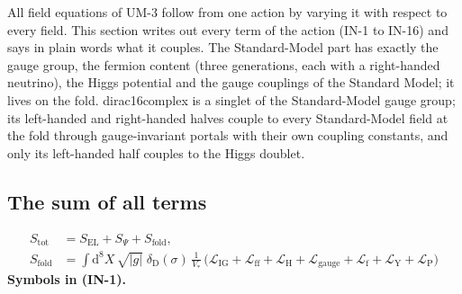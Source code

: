 \documentclass[
  10pt,
]{article}
\begin{document}
All field equations of UM-3 follow from one action by varying it with
respect to every field. This section writes out every term of the action
(IN-1 to IN-16) and says in plain words what it couples. The
Standard-Model part has exactly the gauge group, the fermion content
(three generations, each with a right-handed neutrino), the Higgs
potential and the gauge couplings of the Standard Model; it lives on the
fold. dirac16complex is a singlet of the Standard-Model gauge group; its
left-handed and right-handed halves couple to every Standard-Model field
at the fold through gauge-invariant portals with their own coupling
constants, and only its left-handed half couples to the Higgs doublet.

\hypertarget{the-sum-of-all-terms}{%
\subsection{The sum of all terms}\label{the-sum-of-all-terms}}

\[
\begin{aligned}
S_{\mathrm{tot}} &= S_{\mathrm{EL}} + S_\Psi + S_{\mathrm{fold}},\\
S_{\mathrm{fold}} &= \int\mathrm{d}^8X\,\sqrt{\lvert g\rvert}\;\delta_{\mathrm{D}}(\sigma)\,\frac{1}{V_*}\,
\big(\mathcal{L}_{\mathrm{IG}} + \mathcal{L}_{\mathrm{ff}} + \mathcal{L}_{\mathrm{H}} + \mathcal{L}_{\mathrm{gauge}}
+ \mathcal{L}_{\mathrm{f}} + \mathcal{L}_{\mathrm{Y}} + \mathcal{L}_{\mathrm{P}}\big)
\end{aligned} \tag{IN-1}
\] \textbf{Symbols in (IN-1).}
\end{document}
